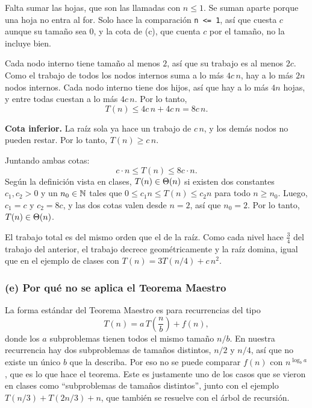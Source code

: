 Falta sumar las hojas, que son las llamadas con $n \le 1$. Se suman aparte porque una
hoja no entra al for. Solo hace la comparación \texttt{n <= 1}, así que cuesta $c$ aunque
su tamaño sea $0$, y la cota de (c), que cuenta $c$ por el tamaño, no la incluye bien.

Cada nodo interno tiene tamaño al menos $2$, así que su trabajo es al menos $2c$. Como el
trabajo de todos los nodos internos suma a lo más $4c\,n$, hay a lo más $2n$ nodos
internos. Cada nodo interno tiene dos hijos, así que hay a lo más $4n$ hojas, y entre
todas cuestan a lo más $4c\,n$. Por lo tanto,
\[
  T(n) \le 4c\,n + 4c\,n = 8c\,n.
\]

\textbf{Cota inferior.} La raíz sola ya hace un trabajo de $c\,n$, y los demás nodos no
pueden restar. Por lo tanto, $T(n) \ge c\,n$.

Juntando ambas cotas:
\[
  c \cdot n \le T(n) \le 8c \cdot n.
\]
Según la definición vista en clases, $T(n) \in \Theta\!\left(n\right)$ si existen dos constantes
$c_1, c_2 > 0$ y un $n_0 \in \mathbb{N}$ tales que $0 \le c_1 n \le T(n) \le c_2 n$ para todo
$n \ge n_0$. Luego, $c_1 = c$ y $c_2 = 8c$, y las dos cotas valen desde $n = 2$, así que
$n_0 = 2$. Por lo tanto, $T(n) \in \Theta\!\left(n\right)$.

El trabajo total es del mismo orden que el de la raíz. Como cada nivel hace $\frac34$ del
trabajo del anterior, el trabajo decrece geométricamente y la raíz domina, igual que en
el ejemplo de clases con $T(n) = 3T(n/4) + c\,n^2$.

\subsubsection*{(e) Por qué no se aplica el Teorema Maestro}

La forma estándar del Teorema Maestro es para recurrencias del tipo
\[
  T(n) = a\, T\!\left(\frac{n}{b}\right) + f(n),
\]
donde los $a$ subproblemas tienen todos el mismo tamaño $n/b$. En nuestra recurrencia hay
dos subproblemas de tamaños distintos, $n/2$ y $n/4$, así que no existe un único $b$ que
la describa. Por eso no se puede comparar $f(n)$ con $n^{\log_b a}$, que es lo que hace
el teorema. Este es justamente uno de los casos que se vieron en clases como
``subproblemas de tamaños distintos'', junto con el ejemplo $T(n/3) + T(2n/3) + n$, que
también se resuelve con el árbol de recursión.

